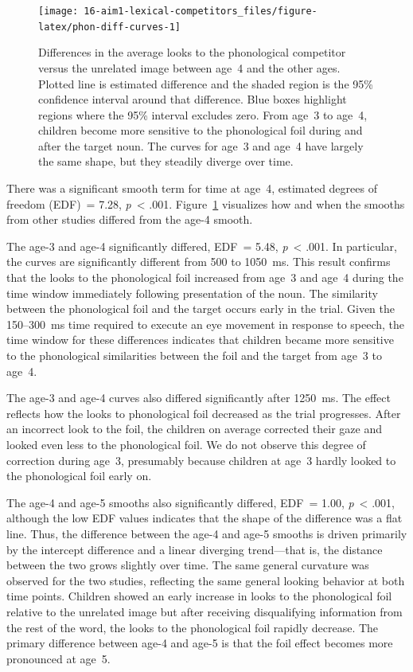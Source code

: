 \documentclass [11pt, proquest] {uwthesis}[2015/03/03]
\begin{document}
\begin{figure}
\texttt{[image: 16-aim1-lexical-competitors\_files/figure-latex/phon-diff-curves-1]} \caption{Differences in the average looks to the
phonological competitor versus the unrelated image between age~4 and the
other ages. Plotted line is estimated difference and the shaded region
is the 95\% confidence interval around that difference. Blue boxes
highlight regions where the 95\% interval excludes zero. From age~3 to
age~4, children become more sensitive to the phonological foil during
and after the target noun. The curves for age~3 and age~4 have largely
the same shape, but they steadily diverge over time.}\label{fig:phon-diff-curves}
\end{figure}
There was a significant smooth term for time at age~4, estimated degrees
of freedom (EDF)~= 7.28, \emph{p}~\textless{} .001.
Figure~\ref{fig:phon-diff-curves} visualizes how and when the smooths
from other studies differed from the age-4 smooth.

The age-3 and age-4 significantly differed, EDF~= 5.48,
\emph{p}~\textless{} .001. In particular, the curves are significantly
different from 500 to 1050~ms. This result confirms that the looks to
the phonological foil increased from age~3 and age~4 during the time
window immediately following presentation of the noun. The similarity
between the phonological foil and the target occurs early in the trial.
Given the 150--300~ms time required to execute an eye movement in
response to speech, the time window for these differences indicates that
children became more sensitive to the phonological similarities between
the foil and the target from age~3 to age~4.

The age-3 and age-4 curves also differed significantly after 1250~ms.
The effect reflects how the looks to phonological foil decreased as the
trial progresses. After an incorrect look to the foil, the children on
average corrected their gaze and looked even less to the phonological
foil. We do not observe this degree of correction during age~3,
presumably because children at age~3 hardly looked to the phonological
foil early on.

The age-4 and age-5 smooths also significantly differed, EDF~= 1.00,
\emph{p}~\textless{} .001, although the low EDF values indicates that
the shape of the difference was a flat line. Thus, the difference
between the age-4 and age-5 smooths is driven primarily by the intercept
difference and a linear diverging trend---that is, the distance between
the two grows slightly over time. The same general curvature was
observed for the two studies, reflecting the same general looking
behavior at both time points. Children showed an early increase in looks
to the phonological foil relative to the unrelated image but after
receiving disqualifying information from the rest of the word, the looks
to the phonological foil rapidly decrease. The primary difference
between age-4 and age-5 is that the foil effect becomes more pronounced
at age~5.
\end{document}

